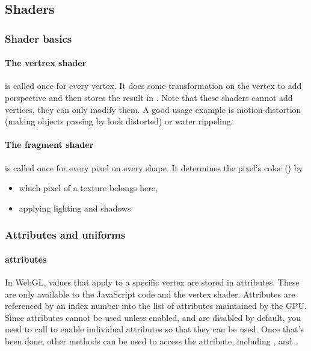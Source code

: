 \subsection{Shaders}

\subsubsection{Shader basics}

\paragraph{The vertrex shader} is called once for every vertex. It does some transformation on the vertex to add perspective and then stores the result in . 
Note that these shaders cannot add vertices, they can only modify them. A good usage example is motion-distortion (making objects passing by look distorted) or water rippeling.

\paragraph{The fragment shader} is called once for every pixel on every shape. It determines the pixel's color () by
\begin{itemize}
    \item which pixel of a texture belongs here, 
    \item applying lighting and shadows
\end{itemize} 

\subsubsection{Attributes and uniforms}

\paragraph{attributes} In WebGL, values that apply to a specific vertex are stored in attributes. These are only available to the JavaScript code and the vertex shader. Attributes are referenced by an index number into the list of attributes maintained by the GPU. 
Since attributes cannot be used unless enabled, and are disabled by default, you need to call  to enable individual attributes so that they can be used. Once that's been done, other methods can be used to access the attribute, including , and .


